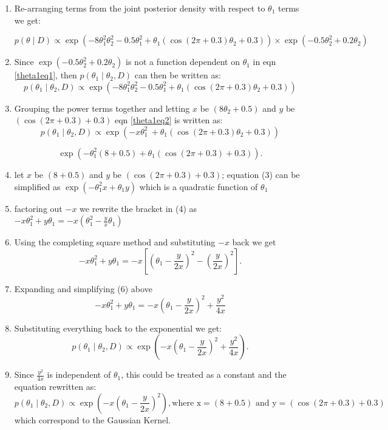 \documentclass[12pt]{article}
\begin{document}
\begin{enumerate}
\item Re-arranging terms from the joint posterior density with respect to $\theta_1$ terms we get:

\begin{equation}\label{theta1eq1}
p(\theta \mid D) \propto \exp \left( -8\theta_1^2\theta_2^2 - 0.5\theta_1^2 + \theta_1(\cos(2\pi + 0.3)\theta_2 + 0.3) \right) \times \exp \left( -0.5\theta_2^2 + 0.2\theta_2 \right)  
\end{equation} 
\item Since  $\exp \left( -0.5\theta_2^2 + 0.2\theta_2 \right)$  is not a function dependent on $\theta_1$ in eqn  \ref{theta1eq1}, then $p(\theta_1 \mid \theta_2 ,D) $ can then be written as:
 \begin{equation}\label{theta1eq2}
p(\theta_1 \mid \theta_2 ,D) \propto \exp \left( -8\theta_1^2\theta_2^2 - 0.5\theta_1^2 + \theta_1(\cos(2\pi + 0.3)\theta_2 + 0.3) \right)
\end{equation}    
\item Grouping the power terms together and letting $x$ be $\left(8\theta_2 +0.5\right)$  and $y$ be $\left(\cos(2\pi + 0.3)+ 0.3\right)$ eqn \ref{theta1eq2} is written as:
 \begin{equation}\label{theta1eq3}
p(\theta_1 \mid \theta_2 ,D) \propto \exp \left( -x\theta_1^2\ + \theta_1(\cos(2\pi + 0.3)\theta_2 + 0.3) \right)
\end{equation}   

    \[\exp\left(-\theta_1^2\left(8 +0.5\right)+ \theta_1 \left(\cos(2\pi + 0.3)+ 0.3\right)\right).\]
    \item let $x$ be $\left(8 +0.5\right)$ and $y$ be $\left(\cos(2\pi + 0.3)+ 0.3\right)$; equation (3) can be simplified as $\exp\left(-\theta_1^2x+ \theta_1y\right)$ which is a quadratic function of $\theta_1$
    \item factoring out $-x$ we rewrite the bracket in (4) as $-x\theta_1^2 + y\theta_1 = -x\left(\theta_1^2 - \frac{y}{x}\theta_1\right)$
    \item Using the completing square method and substituting $-x$ back we get
    \[
-x\theta_1^2 + y\theta_1 = -x\left[\left(\theta_1 - \frac{y}{2x}\right)^2 - \left(\frac{y}{2x}\right)^2\right].
\]
 \item Expanding and simplifying (6) above
 \[
-x\theta_1^2 + y\theta_1 = -x\left(\theta_1 - \frac{y}{2x}\right)^2 + \frac{y^2}{4x}
\]
\item Substituting everything back to the exponential we get:
\[
p(\theta_1 \mid \theta_2, D) \propto \exp\left(-x\left(\theta_1 - \frac{y}{2x}\right)^2 + \frac{y^2}{4x}\right).
\]
\item Since \(\frac{y^2}{4x}\) is independent of \(\theta_1\), this could be treated as a constant and the equation rewritten as:
\[
p(\theta_1 \mid \theta_2, D) \propto \exp\left(-x\left(\theta_1 - \frac{y}{2x}\right)^2\right), \text {where x} =\left(8 +0.5\right) \text { and y} = \left(\cos(2\pi + 0.3)+ 0.3\right)\] which correspond to the Gaussian Kernel. 

\end{enumerate}
\end{document}
